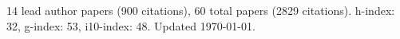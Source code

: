 14 lead author papers (900 citations),
60 total papers (2829 citations).\newline
h-index: 32, g-index: 53, i10-index: 48. Updated \today.